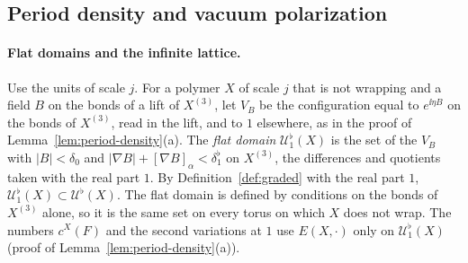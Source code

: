\subsection{Period density and vacuum polarization}\label{subsec:ol-period-vacpol}

\paragraph{Flat domains and the infinite lattice.} Use the units of scale $j$. For a polymer $X$ of scale $j$ that is not wrapping and a field $B$ on the bonds of a lift of $X^{(3)}$, let $V_B$ be the configuration equal to $e^{\ii\eta B}$ on the bonds of $X^{(3)}$, read in the lift, and to $1$ elsewhere, as in the proof of Lemma~\ref{lem:period-density}(a). The \emph{flat domain} $\mathcal U^\flat_1(X)$ is the set of the $V_B$ with $|B|<\delta_0$ and $|\nabla B|+[\nabla B]_\alpha<\delta_1^\flat$ on $X^{(3)}$, the differences and quotients taken with the real part $1$. By Definition~\ref{def:graded} with the real part $1$, $\mathcal U^\flat_1(X)\subset\mathcal U^\flat(X)$. The flat domain is defined by conditions on the bonds of $X^{(3)}$ alone, so it is the same set on every torus on which $X$ does not wrap. The numbers $c^X(F)$ and the second variations at $1$ use $E(X,\cdot)$ only on $\mathcal U^\flat_1(X)$ (proof of Lemma~\ref{lem:period-density}(a)).

